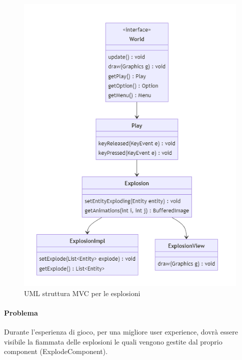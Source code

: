\documentclass[a4paper,12pt]{report}
\begin{document}
\begin{figure}[H]
    \centering{}
    \includegraphics[width=\textwidth]{img/UMLExplosion.png}
    \caption{UML struttura MVC per le esplosioni}
\end{figure}

\paragraph{Problema} Durante l'esperienza di gioco, per una migliore user experience, dovrà essere visibile la fiammata delle esplosioni le quali vengono gestite dal proprio component (ExplodeComponent).
\end{document}

